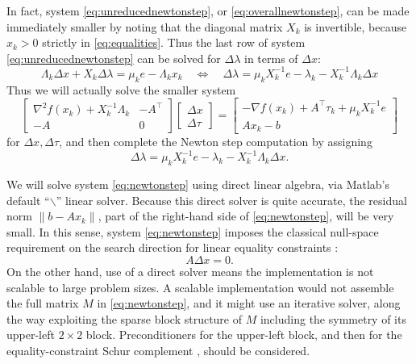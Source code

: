 \documentclass[11pt]{article}
\newcommand{\grad}{\nabla}
\begin{document}
In fact, system \eqref{eq:unreducednewtonstep}, or \eqref{eq:overallnewtonstep}, can be made immediately smaller by noting that the diagonal matrix $X_k$ is invertible, because $x_k>0$ strictly in \eqref{eq:equalities}.  Thus the last row of system \eqref{eq:unreducednewtonstep} can be solved for $\Delta\lambda$ in terms of $\Delta x$:
\begin{equation}
\Lambda_k\Delta x + X_k\Delta \lambda = \mu_k e - \Lambda_k x_k \quad \iff \quad
\Delta\lambda = \mu_k X_k^{-1} e - \lambda_k - X_k^{-1} \Lambda_k \Delta x \label{eq:solvefordlam}
\end{equation}
Thus we will actually solve the smaller system
\begin{equation}
\begin{bmatrix}
\grad^2 f(x_k) + X_k^{-1}\Lambda_k & -A^\top \\
-A             & 0
\end{bmatrix}
\begin{bmatrix}
\Delta x \\
\Delta \tau
\end{bmatrix}
=
\begin{bmatrix}
-\grad f(x_k) + A^\top \tau_k + \mu_k X_k^{-1} e \\
A x_k - b
\end{bmatrix} \label{eq:newtonstep}
\end{equation}
for $\Delta x,\Delta\tau$, and then complete the Newton step computation by assigning
\begin{equation}
\Delta\lambda = \mu_k X_k^{-1} e - \lambda_k - X_k^{-1} \Lambda_k \Delta x. \label{eq:newtonsteplam}
\end{equation}

We will solve system \eqref{eq:newtonstep} using direct linear algebra, via Matlab's default ``$\backslash$'' linear solver.  Because this direct solver is quite accurate, the residual norm $\|b-A x_k\|$, part of the right-hand side of \eqref{eq:newtonstep}, will be very small.  In this sense, system \eqref{eq:newtonstep} imposes the classical null-space requirement on the search direction for linear equality constraints \cite[chapter 3]{GrivaNashSofer2009}:
\begin{equation}
A \Delta x = 0.  \label{eq:dxnull}
\end{equation}
On the other hand, use of a direct solver means the implementation is not scalable to large problem sizes.  A scalable implementation would not assemble the full matrix $M$ in \eqref{eq:newtonstep}, and it might use an iterative solver, along the way exploiting the sparse block structure of $M$ including the symmetry of its upper-left $2\times 2$ block.  Preconditioners \cite{Bueler2021} for the upper-left block, and then for the equality-constraint Schur complement \cite[chapters 14]{Bueler2021}, should be considered.
\end{document}
